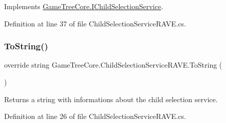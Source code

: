 Implements \mbox{\hyperlink{interface_game_tree_core_1_1_i_child_selection_service}{Game\+Tree\+Core.\+I\+Child\+Selection\+Service}}.



Definition at line 37 of file Child\+Selection\+Service\+R\+A\+V\+E.\+cs.

\mbox{\label{class_game_tree_core_1_1_child_selection_service_r_a_v_e_a995e1c2dfd72caa32cee278de8a836fc}} 
\subsubsection{\texorpdfstring{To\+String()}{ToString()}}
{\footnotesize\ttfamily override string Game\+Tree\+Core.\+Child\+Selection\+Service\+R\+A\+V\+E.\+To\+String (\begin{DoxyParamCaption}{ }\end{DoxyParamCaption})}



Returns a string with informations about the child selection service. 



Definition at line 26 of file Child\+Selection\+Service\+R\+A\+V\+E.\+cs.


